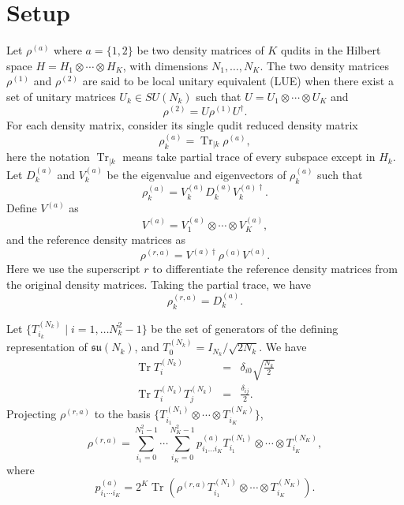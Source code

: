 \documentclass{article}
\DeclareMathOperator{\Tr}{Tr}
\begin{document}
\section{Setup}
\label{sec:setup}
Let $\rho^{(a)}$ where $a = \{1, 2\}$  be two density matrices of $K$ qudits
in the Hilbert space $H = H_1\otimes\cdots\otimes H_K$, with dimensions
$N_1,\ldots,N_K$. The two density matrices $\rho^{(1)}$ and $\rho^{(2)}$
are said to be local unitary equivalent (LUE) when there exist a set
of unitary matrices $U_k\in SU(N_k)$ such that
$U = U_1\otimes\cdots\otimes U_K$ and
\begin{equation}
  \label{eq:rho_lue}
  \rho^{(2)} = U\rho^{(1)}U^\dagger.
\end{equation}
For each density matrix, consider its single qudit reduced density matrix
\begin{equation}
  \label{eq:rho_a_k}
  \rho^{(a)}_k = \Tr_{|k}\rho^{(a)},
\end{equation}
here the notation $\Tr_{|k}$ means take partial trace of every subspace
except in $H_k$.  Let $D_k^{(a)}$ and $V_k^{(a)}$ be the eigenvalue and
eigenvectors of $\rho_k^{(a)}$ such that
\begin{equation}
  \rho^{(a)}_k = V^{(a)}_kD^{(a)}_kV^{(a)\dagger}_k.
\end{equation}
Define $V^{(a)}$ as
\begin{equation}
  V^{(a)} = V^{(a)}_1\otimes\cdots\otimes V^{(a)}_K,
\end{equation}
and the reference density matrices as
\begin{equation}
  \label{eq:rho_ref}
  \rho^{(r, a)} = V^{(a)\dagger}\rho^{(a)}V^{(a)}.
\end{equation}
Here we use the superscript $r$ to differentiate the reference density
matrices from the original density matrices. Taking the partial trace,
we have
\begin{equation}
  \label{eq:rho_ref_k}
  \rho^{(r,a)}_k = D^{(a)}_k.
\end{equation}

Let $\{T^{(N_k)}_{i_k}\mid i = 1,\ldots N_k^2-1\}$ be the set of generators
of the defining representation of $\mathfrak{su}(N_k)$\cite{Haber_2021},
and $T^{(N_k)}_0 = I_{N_k}/\sqrt{2N_k}$.
We have
\begin{eqnarray}
  \label{eq:trace_t}
  \Tr T^{(N_k)}_i & = & \delta_{i0}\sqrt{\frac{N_k}2} \\
  \label{eq:trace_t_t}
  \Tr T^{(N_k)}_iT^{(N_k)}_j & = &\frac{\delta_{ij}}2.
\end{eqnarray}
Projecting $\rho^{(r,a)}$ to the basis
$\{T^{(N_1)}_{i_1}\otimes\cdots\otimes T^{(N_K)}_{i_K}\}$,
\begin{equation}
  \label{eq:ref_rho_proj}
  \rho^{(r,a)} = \sum_{i_1=0}^{N_1^2-1}\cdots\sum_{i_K=0}^{N_K^2-1}
  p^{(a)}_{i_1\ldots i_K}T^{(N_1)}_{i_1}\otimes\cdots\otimes T^{(N_K)}_{i_K},
\end{equation}
where
\begin{equation}
  p^{(a)}_{i_1\cdots i_K} = 2^K\Tr\left(\rho^{(r,a)}T^{(N_1)}_{i_1}\otimes\cdots\otimes T^{(N_K)}_{i_K}\right).
\end{equation}
\end{document}

